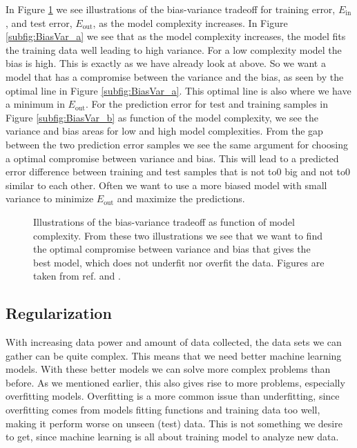 \documentclass[a4paper, american, 12pt]{report}
\begin{document}
	In Figure \ref{fig:BiasVar} we see illustrations of the bias-variance tradeoff for training error, $E_{\text{in}}$, and test error, $E_{\text{out}}$, as the model complexity increases. In Figure \ref{subfig:BiasVar_a} we see that as the model complexity increases, the model fits the training data well leading to high variance. For a low complexity model the bias is high. This is exactly as we have already look at above. So we want a model that has a compromise between the variance and the bias, as seen by the optimal line in Figure \ref{subfig:BiasVar_a}. This optimal line is also where we have a minimum in $E_{\text{out}}$. For the prediction error for test and training samples in Figure \ref{subfig:BiasVar_b} as function of the model complexity, we see the variance and bias areas for low and high model complexities. From the gap between the two prediction error samples we see the same argument for choosing a optimal compromise between variance and bias. This will lead to a predicted error difference between training and test samples that is not to0 big and not to0 similar to each other. Often we want to use a more biased model with small variance to minimize $E_{\text{out}}$ and maximize the predictions.
	\begin{figure}[h!]
		\hspace*{-1.0cm}
		\hspace{0.45em}
		\caption[Bias-variance tradeoff and model complexity.]{Illustrations of the bias-variance tradeoff as function of model complexity. From these two illustrations we see that we want to find the optimal compromise between variance and bias that gives the best model, which does not underfit nor overfit the data. Figures are taken from ref. \citet{hastie2009elements} and \citet{mehta2019high}. \label{fig:BiasVar}}
	\end{figure}


	\subsection{Regularization}
	\label{subsect:Theory-Regularization}
	With increasing data power and amount of data collected, the data sets we can gather can be quite complex. This means that we need better machine learning models. With these better models we can solve more complex problems than before. As we mentioned earlier, this also gives rise to more problems, especially overfitting models. Overfitting is a more common issue than underfitting, since overfitting comes from models fitting functions and training data too well, making it perform worse on unseen (test) data. This is not something we desire to get, since machine learning is all about training model to analyze new data.
	
\end{document}
